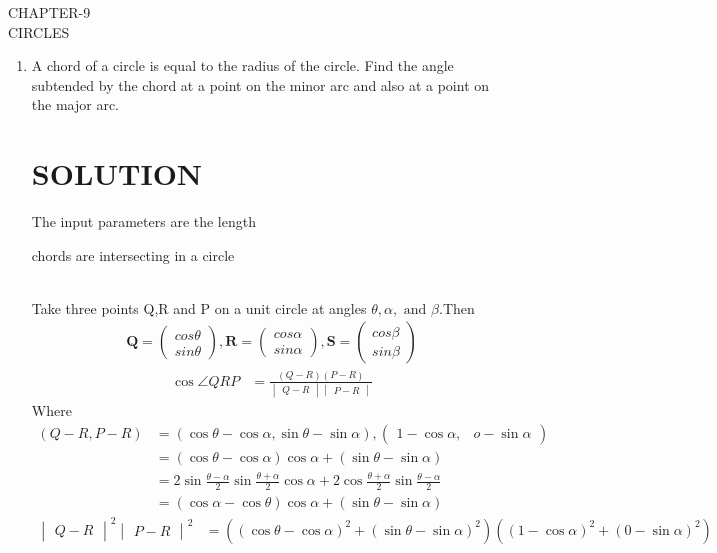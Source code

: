 \documentclass[12pt]{article}
\newcommand{\mydet}[1]{\ensuremath{\begin{vmatrix}#1\end{vmatrix}}}
\newcommand{\myvec}[1]{\ensuremath{\begin{pmatrix}#1\end{pmatrix}}}
\let\vec\mathbf
\begin{document}
\begin{center}
\textbf\large{CHAPTER-9 \\ CIRCLES}

\end{center}
\begin{enumerate}
\section{EXERCISE-10.5}
\item A chord of a circle is equal to the radius of the circle. Find the angle subtended by the chord at a point on the minor arc and also at a point on the major arc.
\section{SOLUTION}
The input parameters are the length\\
\begin{table}[h!]
	
\caption{chords are intersecting in a circle}
\label{table}	
\end{table}
\\
Take three points Q,R and P on a unit circle  at angles $\theta,\alpha,\text{ and }\beta$.Then
\begin{align}
	\vec{Q} = \myvec{cos\theta\\sin\theta},
	\vec{R} = \myvec{cos\alpha\\sin\alpha},
	\vec{S} = \myvec{cos\beta\\sin\beta}
\end{align}
\begin{align}
	\cos\angle QRP&= \frac{(Q-R)(P-R)}{\mydet{Q-R}\mydet{P-R}}\label{2}
\end{align}
Where
\begin{align}
(Q-R, P-R)&= (\cos\theta-\cos\alpha,\sin\theta-\sin\alpha),\myvec{1-\cos\alpha,& o-\sin\alpha}\\
&=(\cos\theta-\cos\alpha)\cos\alpha+(\sin\theta-\sin\alpha)\\
&=2\sin\frac{\theta-\alpha}{2}\sin\frac{\theta+\alpha}{2}\cos\alpha+2\cos\frac{\theta+\alpha}{2}\sin\frac{\theta-\alpha}{2}\\
&=(\cos\alpha-\cos\theta)\cos\alpha+(\sin\theta-\sin\alpha)\label{6}
\end{align}
\begin{align}
\mydet{Q-R}^2\mydet{P-R}^2 &= ((\cos\theta-\cos\alpha)^2+(\sin\theta-\sin\alpha)^2)
	((1-\cos\alpha)^2+(0-\sin\alpha)^2)\\

\end{align}
\end{enumerate}
\end{document}
